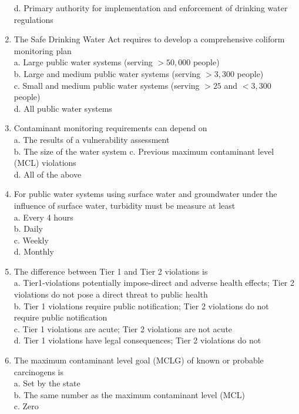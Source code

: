 \begin{enumerate}
d. Primary authority for implementation and enforcement of drinking water regulations\\
\item The Safe Drinking Water Act requires to develop a comprehensive coliform monitoring plan\\
a. Large public water systems (serving $>50,000$ people)\\
b. Large and medium public water systems (serving $>3,300$ people)\\
c. Small and medium public water systems (serving $>25$ and $<3,300$ people)\\
d. All public water systems\\
\item Contaminant monitoring requirements can depend on\\
a. The results of a vulnerability assessment\\
b. The size of the water system c. Previous maximum contaminant level (MCL) violations\\
d. All of the above\\
\item For public water systems using surface water and groundwater under the influence of surface water, turbidity must be measure at least\\
a. Every 4 hours\\
b. Daily\\
c. Weekly\\
d. Monthly\\
\item The difference between Tier 1 and Tier 2 violations is\\
a. Tier1-violations potentially impose-direct and adverse health effects; Tier 2 violations do not pose a direct threat to public health\\
b. Tier 1 violations require public notification; Tier 2 violations do not require public notification\\
c. Tier 1 violations are acute; Tier 2 violations are not acute\\
d. Tier 1 violations have legal consequences; Tier 2 violations do not\\
\item The maximum contaminant level goal (MCLG) of known or probable carcinogens is\\
a. Set by the state\\
b. The same number as the maximum contaminant level (MCL)\\
c. Zero\\

\end{enumerate}
